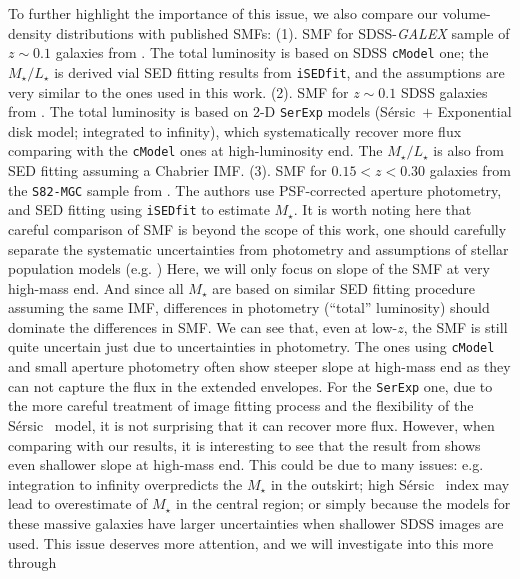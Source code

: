 \documentclass{emulateapj}
\def\ser{{S\'{e}rsic\ }}
\def\cmodel{\texttt{cModel}}
\def\mstar{{$M_{\star}$}}
\def\m2l{{$M_{\star}/L_{\star}$}}
\newcommand{\update}[1]{\textcolor{Bittersweet}{#1}}
\begin{document}
\begin{CJK*}{UTF8}{gbsn}
    \update{ 
    To further highlight the importance of this issue, we also compare our 
    volume-density distributions with published SMFs:  
    (1). SMF for SDSS-\textit{GALEX} sample of $z\sim 0.1$ galaxies from 
    \citep{Moustakas13}. 
    The total luminosity is based on SDSS \cmodel{} one; the \m2l{} is derived 
    vial SED fitting results from \texttt{iSEDfit}, and the assumptions are very similar 
    to the ones used in this work. 
    (2). SMF for $z\sim 0.1$ SDSS galaxies from \citep{Bernardi2013}. 
    The total luminosity is based on 2-D \texttt{SerExp} models (\ser{}$+$
    Exponential disk model; integrated to infinity), which systematically recover 
    more flux comparing with the \cmodel{} ones at high-luminosity end. 
    The \m2l{} is also from SED fitting assuming a Chabrier IMF.  
    (3). SMF for $0.15 < z < 0.30$ galaxies from the \texttt{S82-MGC} sample from 
    \citep{Leauthaud2016}.  The authors use PSF-corrected aperture photometry, and 
    SED fitting using \texttt{iSEDfit} to estimate \mstar{}. 
    It is worth noting here that careful comparison of SMF is beyond the scope of 
    this work, one should carefully separate the systematic uncertainties from 
    photometry and assumptions of stellar population models (e.g. \citealt{Bernardi2016})
    Here, we will only focus on slope of the SMF at very high-mass end. 
    And since all \mstar{} are based on similar SED fitting procedure assuming the same
    IMF, differences in photometry (``total'' luminosity) should dominate the 
    differences in SMF. 
    We can see that, even at low-$z$, the SMF is still quite uncertain just due to 
    uncertainties in photometry. 
    The ones using \cmodel{} and small aperture photometry often show steeper slope 
    at high-mass end as they can not capture the flux in the extended envelopes. 
    For the \texttt{SerExp} one, due to the more careful treatment of image fitting 
    process and the flexibility of the \ser{} model, it is not surprising that it can 
    recover more flux.  
    However, when comparing with our results, it is interesting to see that the 
    result from \citep{Bernardi2013} shows even shallower slope at high-mass end.  
    This could be due to many issues: e.g. integration to infinity overpredicts the 
    \mstar{} in the outskirt; high \ser{} index may lead to overestimate of \mstar{} 
    in the central region; or simply because the models for these massive galaxies have 
    larger uncertainties when shallower SDSS images are used. 
    This issue deserves more attention, and we will investigate into this more through 
}
\end{CJK*}
\end{document}
